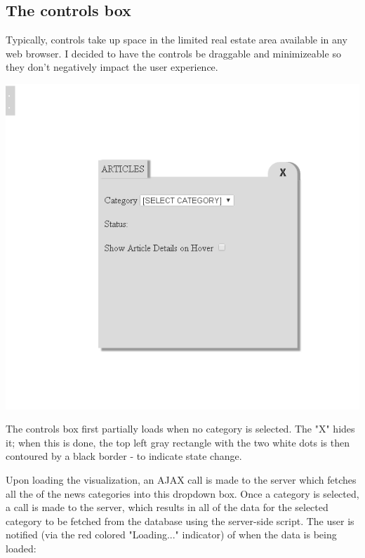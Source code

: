 \documentclass[12pt]{article}
\begin{document}
\subsection{The controls box}

Typically, controls take up space in the limited real estate area available in any web browser. I decided to have the controls be draggable and minimizeable so they don't negatively impact the user experience. 

\noindent\includegraphics[scale=0.9]{img/viz_3}

\noindent The controls box first partially loads when no category is selected. The "X" hides it; when this is done, the top left gray rectangle with the two white dots is then contoured by a black border - to indicate state change.

Upon loading the visualization, an AJAX call is made to the server which fetches all the of the news categories into this dropdown box. Once a category is selected, a call is made to the server, which results in all of the data for the selected category to be fetched from the database using the server-side script. The user is notified (via the red colored "Loading..." indicator) of when the data is being loaded:
\end{document}
